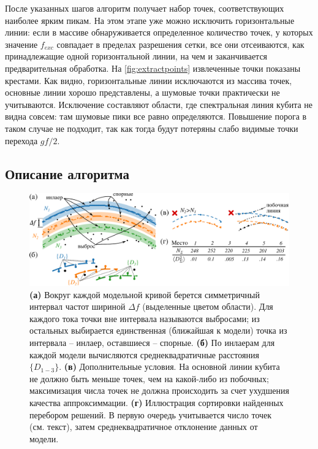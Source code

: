 \documentclass[14pt, a4paper]{extreport}
\numberwithin{equation}{section}
\begin{document}
	После указанных шагов алгоритм получает набор точек, соответствующих наиболее ярким пикам. На этом этапе уже можно исключить горизонтальные линии: если в массиве обнаруживается определенное количество точек, у которых значение $f_{exc}$ совпадает в пределах разрешения сетки, все они отсеиваются, как принадлежащие одной горизонтальной линии, на чем и заканчивается предварительная обработка. На \autoref{fig:extractpoints} извлеченные точки показаны крестами. Как видно, горизонтальные линии исключаются из массива точек, основные линии хорошо представлены, а шумовые точки практически не учитываются. Исключение составляют области, где спектральная линия кубита не видна совсем: там шумовые пики все равно определяются. Повышение порога в таком случае не подходит, так как тогда будут потеряны слабо видимые точки перехода $gf/2$.
	
	\subsection{Описание алгоритма}
	
	
	\begin{figure}
		\centering
		\includegraphics[width=\linewidth]{Pictures/hough_illustration}
		\caption{\textbf{(а)} Вокруг каждой модельной кривой берется симметричный интервал частот шириной $\Delta f$ (выделенные цветом области). Для каждого тока точки вне интервала называются выбросами; из остальных выбирается единственная (ближайшая к модели) точка из интервала -- инлаер, оставшиеся -- спорные. \textbf{(б)} По инлаерам для каждой модели вычисляются среднеквадратичные расстояния $\{D_{1-3}\}$. \textbf{(в)} Дополнительные условия. На основной линии кубита не должно быть меньше точек, чем на какой-либо из побочных; максимизация числа точек не должна происходить за счет ухудшения качества аппроксиммации. \textbf{(г)} Иллюстрация сортировки найденных перебором решений. В первую очередь учитывается число точек (см. текст), затем среднеквадратичное отклонение данных от модели.}
		\label{fig:houghillustration}
	\end{figure}
\end{document}
